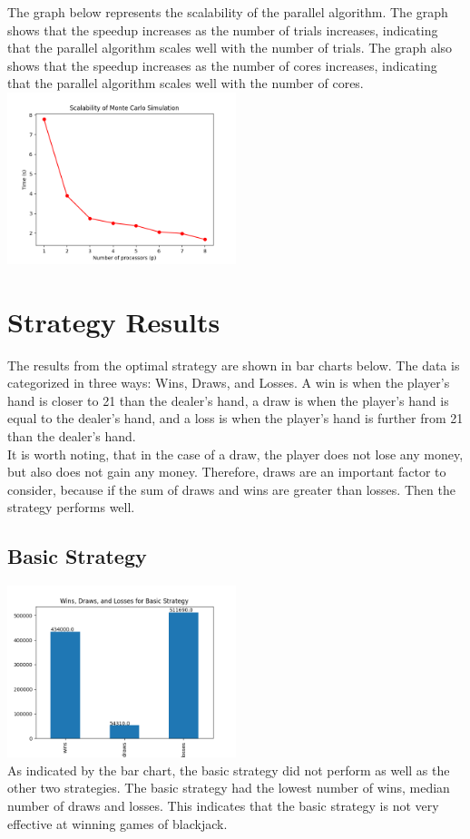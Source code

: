\documentclass[twocolumn]{report}
\begin{document}
The graph below represents the scalability of the parallel algorithm. The graph shows that the speedup increases as the number of trials increases, indicating that the parallel algorithm scales well with the number of trials. The graph also shows that the speedup increases as the number of cores increases, indicating that the parallel algorithm scales well with the number of cores.\\
\includegraphics[width=0.5\textwidth]{src/mc_scale.png}

\section{Strategy Results}
The results from the optimal strategy are shown in bar charts below. The data is categorized in three ways: Wins, Draws, and Losses.
A win is when the player's hand is closer to 21 than the dealer's hand, a draw is when the player's hand is equal to the dealer's hand, and a loss is when the player's hand is further from 21 than the dealer's hand.\\
It is worth noting, that in the case of a draw, the player does not lose any money, but also does not gain any money. Therefore, draws are an important factor to consider, because if the sum of draws and wins are greater than losses. Then the strategy performs well.

\subsection{Basic Strategy}
\includegraphics[width=0.5\textwidth]{src/basic.png}\\
As indicated by the bar chart, the basic strategy did not perform as well as the other two strategies. The basic strategy had the lowest number of wins, median number of draws and losses. This indicates that the basic strategy is not very effective at winning games of blackjack.
\end{document}
